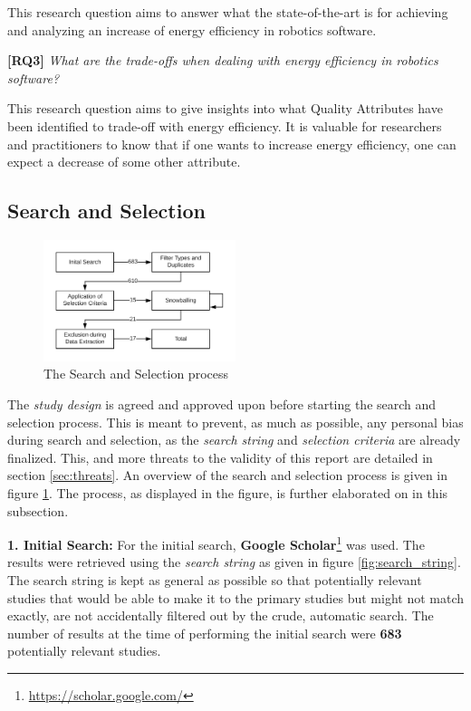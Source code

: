 This research question aims to answer what the state-of-the-art is for achieving and analyzing an increase of energy efficiency in robotics software.

\vspace{5mm}

\textbf{[RQ3]} \textit{What are the trade-offs when dealing with energy efficiency in robotics software?}

\vspace{5mm}

This research question aims to give insights into what Quality Attributes have been identified to trade-off with energy efficiency. 
It is valuable for researchers and practitioners to know that if one wants to increase energy efficiency, one can expect a decrease of some other attribute.

\subsection{Search and Selection}
\label{sec:study_design:search_selection}
\begin{figure}
    \centering
    \includegraphics[width=0.5\textwidth]{figures/selection_process.png}
    \caption{The Search and Selection process}
    \label{fig:search_selec_process}
\end{figure}

The \textit{study design} is agreed and approved upon before starting the search and selection process. 
This is meant to prevent, as much as possible, any personal bias during search and selection, as the \textit{search string} and \textit{selection criteria} are already finalized.
This, and more threats to the validity of this report are detailed in section \ref{sec:threats}.
An overview of the search and selection process is given in figure \ref{fig:search_selec_process}.
The process, as displayed in the figure, is further elaborated on in this subsection.

\vspace{5mm}

\noindent\textbf{1. Initial Search:}
For the initial search, \textbf{Google Scholar}\footnote{\url{https://scholar.google.com/}} was used. The results were retrieved using the \textit{search string} as given in figure \ref{fig:search_string}. 
The search string is kept as general as possible so that potentially relevant studies that would be able to make it to the primary studies but might not match exactly, are not accidentally filtered out by the crude, automatic search.
The number of results at the time of performing the initial search were \textbf{683} potentially relevant studies.

